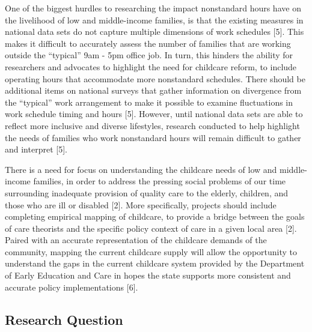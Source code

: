 \documentclass[10pt,letterpaper]{article}
\begin{document}
One of the biggest hurdles to researching the impact nonstandard hours
have on the livelihood of low and middle-income families, is that the
existing measures in national data sets do not capture multiple
dimensions of work schedules {[}5{]}. This makes it difficult to
accurately assess the number of families that are working outside the
``typical'' 9am - 5pm office job. In turn, this hinders the ability for
researchers and advocates to highlight the need for childcare reform, to
include operating hours that accommodate more nonstandard schedules.
There should be additional items on national surveys that gather
information on divergence from the ``typical'' work arrangement to make
it possible to examine fluctuations in work schedule timing and hours
{[}5{]}. However, until national data sets are able to reflect more
inclusive and diverse lifestyles, research conducted to help highlight
the needs of families who work nonstandard hours will remain difficult
to gather and interpret {[}5{]}.

There is a need for focus on understanding the childcare needs of low
and middle-income families, in order to address the pressing social
problems of our time surrounding inadequate provision of quality care to
the elderly, children, and those who are ill or disabled {[}2{]}. More
specifically, projects should include completing empirical mapping of
childcare, to provide a bridge between the goals of care theorists and
the specific policy context of care in a given local area {[}2{]}.
Paired with an accurate representation of the childcare demands of the
community, mapping the current childcare supply will allow the
opportunity to understand the gaps in the current childcare system
provided by the Department of Early Education and Care in hopes the
state supports more consistent and accurate policy implementations
{[}6{]}.

\subsection{Research Question}\label{research-question}
\end{document}
